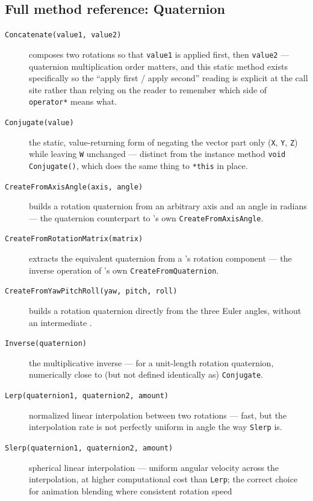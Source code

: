 \subsection{Full method reference: Quaternion}
\label{sec:quaternion-full-reference}

\begin{description}
\item[\texttt{Concatenate(value1, value2)}] composes two rotations so that \texttt{value1} is
  applied first, then \texttt{value2} --- quaternion multiplication order matters, and this
  static method exists specifically so the ``apply first / apply second'' reading is explicit
  at the call site rather than relying on the reader to remember which side of
  \texttt{operator*} means what.
\item[\texttt{Conjugate(value)}] the static, value-returning form of negating the vector part
  only (\texttt{X}, \texttt{Y}, \texttt{Z}) while leaving \texttt{W} unchanged --- distinct from
  the instance method \texttt{void Conjugate()}, which does the same thing to \texttt{*this} in
  place.
\item[\texttt{CreateFromAxisAngle(axis, angle)}] builds a rotation quaternion from an arbitrary
  axis and an angle in radians --- the quaternion counterpart to
  's own \texttt{CreateFromAxisAngle}.
\item[\texttt{CreateFromRotationMatrix(matrix)}] extracts the equivalent quaternion from a
  's rotation component --- the inverse operation of
  's own \texttt{CreateFromQuaternion}.
\item[\texttt{CreateFromYawPitchRoll(yaw, pitch, roll)}] builds a rotation quaternion directly
  from the three Euler angles, without an intermediate .
\item[\texttt{Inverse(quaternion)}] the multiplicative inverse --- for a unit-length rotation
  quaternion, numerically close to (but not defined identically as) \texttt{Conjugate}.
\item[\texttt{Lerp(quaternion1, quaternion2, amount)}] normalized linear interpolation between
  two rotations --- fast, but the interpolation rate is not perfectly uniform in angle the way
  \texttt{Slerp} is.
\item[\texttt{Slerp(quaternion1, quaternion2, amount)}] spherical linear interpolation ---
  uniform angular velocity across the interpolation, at higher computational cost than
  \texttt{Lerp}; the correct choice for animation blending where consistent rotation speed

\end{description}
